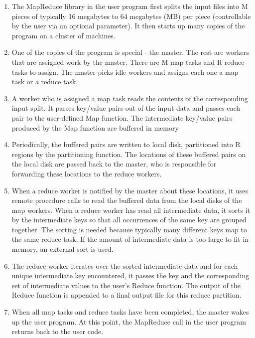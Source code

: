 \documentclass{article}
\begin{document}
\begin{enumerate}
      \item The MapReduce library in the user program first
      splits the input files into M pieces of typically 16
      megabytes to 64 megabytes (MB) per piece (controllable by the user via an optional parameter). It
      then starts up many copies of the program on a cluster of machines.
      \item One of the copies of the program is special - the
      master. The rest are workers that are assigned work
      by the master. There are M map tasks and R reduce
      tasks to assign. The master picks idle workers and
      assigns each one a map task or a reduce task.
      \item A worker who is assigned a map task reads the
      contents of the corresponding input split. It parses
      key/value pairs out of the input data and passes each
      pair to the user-defined Map function. The intermediate key/value pairs produced by the Map function
      are buffered in memory
      \item  Periodically, the buffered pairs are written to local
      disk, partitioned into R regions by the partitioning
      function. The locations of these buffered pairs on
      the local disk are passed back to the master, who
      is responsible for forwarding these locations to the
      reduce workers.
      \item When a reduce worker is notified by the master
      about these locations, it uses remote procedure calls
      to read the buffered data from the local disks of the
      map workers. When a reduce worker has read all intermediate data, it sorts it by the intermediate keys
      so that all occurrences of the same key are grouped
      together. The sorting is needed because typically
      many different keys map to the same reduce task. If
      the amount of intermediate data is too large to fit in
      memory, an external sort is used.
      \item The reduce worker iterates over the sorted intermediate data and for each unique intermediate key encountered, it passes the key and the corresponding
      set of intermediate values to the user's Reduce function. The output of the Reduce function is appended
      to a final output file for this reduce partition.
      \item When all map tasks and reduce tasks have been
      completed, the master wakes up the user program.
      At this point, the MapReduce call in the user program returns back to the user code.
\end{enumerate}
\end{document}
